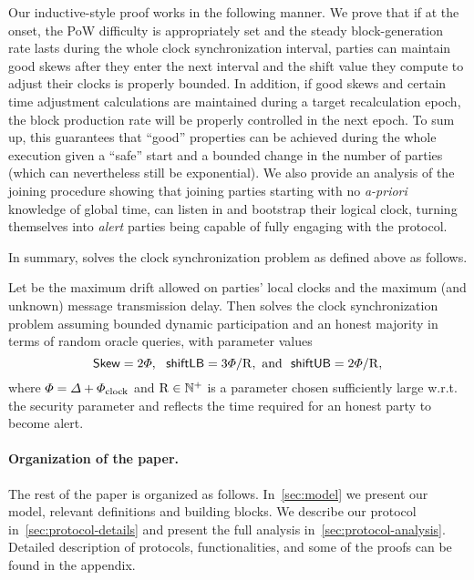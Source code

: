 Our inductive-style proof works in the following manner.
%
We prove that if at the onset, the PoW difficulty is appropriately set and the steady block-generation rate lasts during the whole clock synchronization interval, parties can maintain good skews after they enter the next interval and the shift value they compute to adjust their clocks  is properly bounded.
%
In addition, if good skews and certain time adjustment calculations are maintained during a target recalculation epoch, the block production rate will be properly controlled in the next epoch.
%
To sum up, this guarantees that ``good'' properties can be achieved during the whole execution given a ``safe'' start and a bounded change in the number of parties (which can nevertheless still be exponential).
%
We also provide an analysis of the joining procedure showing that joining parties starting with no \emph{a-priori} knowledge of global time, can listen in and bootstrap their logical clock,  turning themselves into \emph{alert} parties being capable of fully engaging with the protocol.

In summary, \timekeeper solves the clock synchronization problem as defined above as follows.

\begin{theorem*}
    Let \maxdrift be the maximum drift allowed on parties' local clocks and \delay the maximum (and unknown) message transmission delay.
    Then \timekeeper solves the clock synchronization problem assuming bounded dynamic participation and an honest majority in terms of random oracle queries, with parameter values
    \[ \mathsf{Skew} = 2\varPhi,~~ \mathsf{shiftLB} = 3\varPhi / \mathrm{R}, ~\text{and}~~ \mathsf{shiftUB} = 2\varPhi / \mathrm{R}, \]
    where $\varPhi = \varDelta + \varPhi_{\mathrm{clock}}$ and $\mathrm{R} \in \mathbb{N}^+$ is a parameter chosen sufficiently large w.r.t. the security parameter and reflects the time required for an honest party to become alert.
\end{theorem*}

\paragraph{Organization of the paper.}
%
The rest of the paper is organized as follows.
%
In~\cref{sec:model} we present our model, relevant definitions and building blocks.
%
We describe our \timekeeper protocol in~\cref{sec:protocol-details} and present the full analysis in~\cref{sec:protocol-analysis}.
%
Detailed description of protocols, functionalities, and some of the proofs can be found in the appendix.
